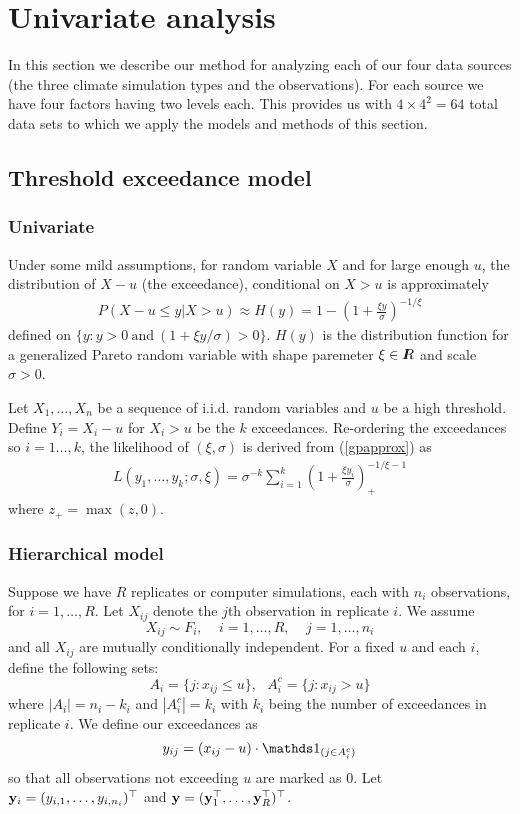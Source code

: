 \section{Univariate analysis}
\label{margin}

In this section we describe our method for analyzing each of our four data sources (the three climate simulation types and the observations). For each source we have four factors having two levels each. This provides us with $4\times 4^2=64$ total data sets to which we apply the models and methods of this section.

\subsection{Threshold exceedance model}
\label{thresh}

\subsubsection{Univariate}
\label{univariate}

Under some mild assumptions, for random variable $X$ and for large enough $u$, the distribution of $X-u$ (the exceedance), conditional on $X>u$ is approximately
\begin{align}
P(X-u\leq y|X>u) \approx H(y) = 1 - \left(1+\frac{\xi y}{\sigma}\right)^{-1/\xi} \label{gpapprox}
\end{align}
defined on $\{y:y>0~\mathrm{and}~(1+\xi y/\sigma) >0\}$. $H(y)$ is the distribution function for a generalized Pareto random variable with shape paremeter $\xi\in I\hspace{-4.4pt}R$ and scale $\sigma>0$.

Let $X_1,\ldots,X_n$ be a sequence of i.i.d. random variables and $u$ be a high threshold. Define $Y_i=X_i-u$ for $X_i>u$ be the $k$ exceedances. Re-ordering the exceedances so $i=1\ldots,k$, the likelihood of $(\xi,\sigma)$ is derived from (\ref{gpapprox}) as
\begin{align}
L(y_1,\ldots,y_k;\sigma,\xi)=\sigma^{-k}\sum_{i=1}^k\left(1+\frac{\xi y_i}{\sigma}\right)_+^{-1/\xi-1} \label{gplike}
\end{align}
where $z_+=\max(z,0)$.

\subsubsection{Hierarchical model}
\label{hier}

Suppose we have $R$ replicates or computer simulations, each with $n_i$ observations, for $i=1,\ldots,R$. Let $X_{ij}$ denote the $j$th observation in replicate $i$. We assume
\[ X_{ij} \sim F_i,~~~~~i=1,\ldots,R,~~~~~j=1,\ldots,n_i \]
and all $X_{ij}$ are mutually conditionally independent. For a fixed $u$ and each $i$, define the following sets:
\[ A_i = \{j:x_{ij}\leq u\},~~~ A_i^c = \{j: x_{ij}>u\} \]
where $|A_i|=n_i-k_i$ and $|A_i^c|=k_i$ with $k_i$ being the number of exceedances in replicate $i$. We define our exceedances as
\[ y_{ij} = (x_{ij}-u)\cdot \ind_{(j \in A_i^c)} \]
so that all observations not exceeding $u$ are marked as $0$. Let $\mathbf{\bm{y}}_i=(y_{i,1},\ldots,y_{i,n_i})^\top$ and $\mathbf{\bm{y}}=(\mathbf{\bm{y}}_1^\top,\ldots,\mathbf{\bm{y}}_R^\top)^\top$.

